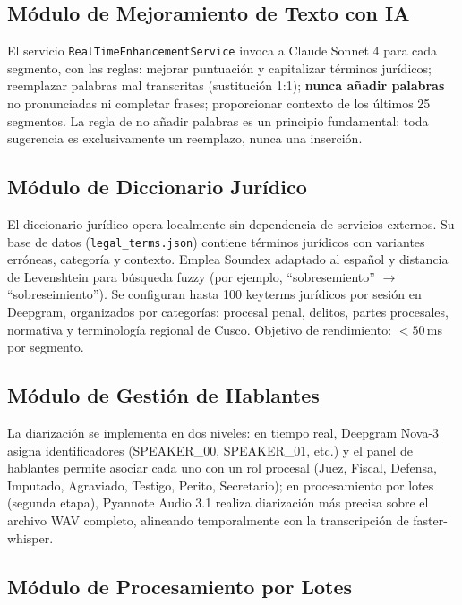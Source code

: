 \documentclass[12pt,a4paper,oneside]{report}
\begin{document}
\subsection{Módulo de Mejoramiento de Texto con IA}

El servicio \texttt{RealTimeEnhancementService} invoca a Claude Sonnet 4 para cada segmento, con las reglas: mejorar puntuación y capitalizar términos jurídicos; reemplazar palabras mal transcritas (sustitución 1:1); \textbf{nunca añadir palabras} no pronunciadas ni completar frases; proporcionar contexto de los últimos 25 segmentos. La regla de no añadir palabras es un principio fundamental: toda sugerencia es exclusivamente un reemplazo, nunca una inserción.

\subsection{Módulo de Diccionario Jurídico}

El diccionario jurídico opera localmente sin dependencia de servicios externos. Su base de datos (\texttt{legal\_terms.json}) contiene términos jurídicos con variantes erróneas, categoría y contexto. Emplea Soundex adaptado al español y distancia de Levenshtein para búsqueda fuzzy (por ejemplo, ``sobresemiento'' $\to$ ``sobreseimiento''). Se configuran hasta 100 keyterms jurídicos por sesión en Deepgram, organizados por categorías: procesal penal, delitos, partes procesales, normativa y terminología regional de Cusco. Objetivo de rendimiento: $< 50$\,ms por segmento.

\subsection{Módulo de Gestión de Hablantes}

La diarización se implementa en dos niveles: en tiempo real, Deepgram Nova-3 asigna identificadores (SPEAKER\_00, SPEAKER\_01, etc.) y el panel de hablantes permite asociar cada uno con un rol procesal (Juez, Fiscal, Defensa, Imputado, Agraviado, Testigo, Perito, Secretario); en procesamiento por lotes (segunda etapa), Pyannote Audio 3.1 realiza diarización más precisa sobre el archivo WAV completo, alineando temporalmente con la transcripción de faster-whisper.

\subsection{Módulo de Procesamiento por Lotes}
\end{document}
